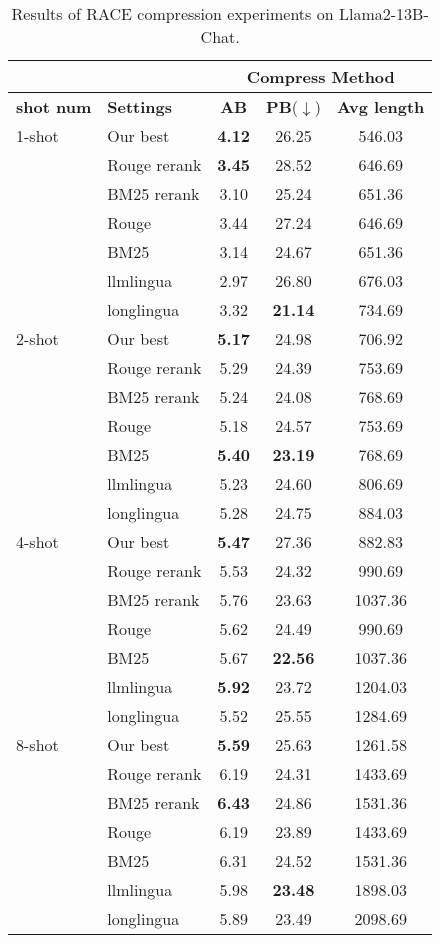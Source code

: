\begin{table}[t]
\renewcommand\arraystretch{1.1}
\setlength{\tabcolsep}{4pt}
\centering
\small
\begin{tabular}{l|l|ccc}
\bottomrule
  \multicolumn{2}{l}{} &\multicolumn{3}{c}{\textbf{Compress Method}} \\
\hline
\textbf{shot num} & \textbf{Settings} & \textbf{AB} & \textbf{PB}($\downarrow$) & \textbf{Avg length}\\
\hline
1-shot & Our best & \textbf{4.12} & 26.25 & 546.03\\
 & Rouge rerank & \textbf{3.45} & 28.52 & 646.69\\
 & BM25 rerank & 3.10 & 25.24 & 651.36\\
 & Rouge & 3.44 & 27.24 & 646.69\\
 & BM25 & 3.14 & 24.67 & 651.36\\
 & llmlingua & 2.97 & 26.80 & 676.03\\
 & longlingua & 3.32 & \textbf{21.14} & 734.69\\
\hline
2-shot & Our best & \textbf{5.17} & 24.98 & 706.92\\
 & Rouge rerank & 5.29 & 24.39 & 753.69\\
 & BM25 rerank & 5.24 & 24.08 & 768.69\\
 & Rouge & 5.18 & 24.57 & 753.69\\
 & BM25 & \textbf{5.40} & \textbf{23.19} & 768.69\\
 & llmlingua & 5.23 & 24.60 & 806.69\\
 & longlingua & 5.28 & 24.75 & 884.03\\
\hline
4-shot & Our best & \textbf{5.47} & 27.36 & 882.83\\
 & Rouge rerank & 5.53 & 24.32 & 990.69\\
 & BM25 rerank & 5.76 & 23.63 & 1037.36\\
 & Rouge & 5.62 & 24.49 & 990.69\\
 & BM25 & 5.67 & \textbf{22.56} & 1037.36\\
 & llmlingua & \textbf{5.92} & 23.72 & 1204.03\\
 & longlingua & 5.52 & 25.55 & 1284.69\\
\hline
8-shot & Our best & \textbf{5.59} & 25.63 & 1261.58\\
 & Rouge rerank & 6.19 & 24.31 & 1433.69\\
 & BM25 rerank & \textbf{6.43} & 24.86 & 1531.36\\
 & Rouge & 6.19 & 23.89 & 1433.69\\
 & BM25 & 6.31 & 24.52 & 1531.36\\
 & llmlingua & 5.98 & \textbf{23.48} & 1898.03\\
 & longlingua & 5.89 & 23.49 & 2098.69\\
\hline
\toprule
\end{tabular}
\caption{Results of RACE compression experiments on Llama2-13B-Chat. 
}
\label{tab:comp_dg}
\end{table}